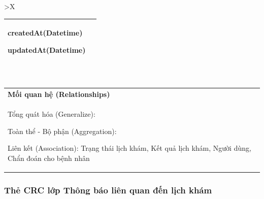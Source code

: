 \begin{xltabular}{\textwidth}{
		>{\centering\arraybackslash}X
	}
\begin{tabularx}{0.9\textwidth}{|X|X|}
		createdAt(Datetime)

		updatedAt(Datetime)
		\\ \hline
	\end{tabularx}
	\\
	\begin{tabularx}{0.9\textwidth}{|X|}
		\hline
		\textbf{Mối quan hệ (Relationships)} \\
		Tổng quát hóa (Generalize):

		Toàn thể - Bộ phận (Aggregation):

		Liên kết (Association): Trạng thái lịch khám, Kết quả lịch khám,
		Người dùng, Chẩn đoán cho bệnh nhân
		\\
		\hline
	\end{tabularx}
\end{xltabular}

\subsubsection{Thẻ CRC lớp Thông báo liên quan đến lịch khám}

